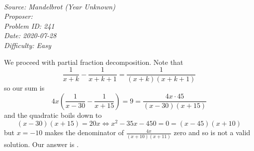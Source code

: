 \SSbreak\\
\emph{Source: Mandelbrot (Year Unknown)}\\
\emph{Proposer: \Ppi}\\
\emph{Problem ID: 241}\\
\emph{Date: 2020-07-28}\\
\emph{Difficulty: Easy}\\
\SSbreak

\bigskip

\begin{solution}\hfil\medskip
  
  We proceed with partial fraction decomposition. Note that 
  $$\dfrac{1}{x + k} - \dfrac{1}{x + k + 1} = \dfrac{1}{(x + k)(x + k + 1)}$$
  so our sum is $$4x\left(\dfrac{1}{x - 30} - \dfrac{1}{x + 15}\right) = 9 = \dfrac{4x \cdot 45}{(x - 30)(x + 15)}$$
  and the quadratic boils down to $$(x - 30)(x + 15) = 20x \iff x^2 - 35x - 450 = 0 = (x - 45)(x + 10)$$ 
  but $x = -10$ makes the denominator of $\frac{4x}{(x + 10)(x + 11)}$ zero and so is not a valid solution. 
  Our answer is .
\end{solution}\bigskip
